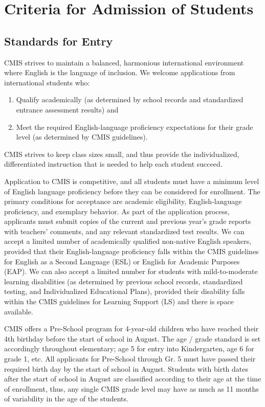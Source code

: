 \documentclass{report}
\begin{document}
\section{Criteria for Admission of Students}

\subsection{Standards for Entry}

CMIS strives to maintain a balanced, harmonious international environment where English is the language of inclusion.  We welcome applications from international students who:
\begin{enumerate}
\item Qualify academically (as determined by school records and standardized entrance assessment results) and
\item Meet the required English-language proficiency expectations for their grade level (as determined by CMIS guidelines).  
\end{enumerate}
CMIS strives to keep class sizes small, and thus provide the individualized, differentiated instruction that is needed to help each student succeed.  

Application to CMIS is competitive, and all students must have a minimum level of English language proficiency before they can be considered for enrollment.  The primary conditions for acceptance are academic eligibility, English-language proficiency, and exemplary behavior.  As part of the application process, applicants must submit copies of the current and previous year’s grade reports with teachers' comments, and any relevant standardized test results.  We can accept a limited number of academically qualified non-native English speakers, provided that their English-language proficiency falls within the CMIS guidelines for English as a Second Language (ESL) or English for Academic Purposes (EAP).  We can also accept a limited number for students with mild-to-moderate learning disabilities (as determined by previous school records, standardized testing, and Individualized Educational Plans), provided their disability falls within the CMIS guidelines for Learning Support (LS) and there is space available.

CMIS offers a Pre-School program for 4-year-old children who have reached their 4th birthday before the start of school in August.  The age / grade standard is set accordingly throughout elementary; age 5 for entry into Kindergarten, age 6 for grade 1, etc.  All applicants for Pre-School through Gr. 5 must have passed their required birth day by the start of school in August.  Students with birth dates after the start of school in August are classified according to their age at the time of enrollment, thus, any single CMIS grade level may have as much as 11 months of variability in the age of the students.  
\end{document}
